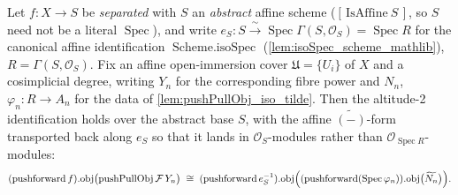 \begin{lemma}

  \label{lem:pushPullObj_iso_tilde_affine}
  Let \(f : X \to S\) be \emph{separated} with \(S\) an \emph{abstract} affine scheme
  (\([\,\mathrm{IsAffine}\ S\,]\), so \(S\) need not be a literal \(\operatorname{Spec}\)), and
  write \(e_S : S \xrightarrow{\ \sim\ } \operatorname{Spec}\Gamma(S, \mathcal{O}_S) =
  \operatorname{Spec} R\) for the canonical affine identification \(\operatorname{Scheme.isoSpec}\)
  (\cref{lem:isoSpec_scheme_mathlib}), \(R = \Gamma(S, \mathcal{O}_S)\). Fix an affine
  open-immersion cover \(\mathfrak{U} = \{U_i\}\) of \(X\) and a cosimplicial degree, writing
  \(Y_n\) for the corresponding fibre power and \(N_n\), \(\varphi_n : R \to A_n\) for the data of
  \cref{lem:pushPullObj_iso_tilde}. Then the altitude-2 identification holds over the abstract
  base \(S\), with the affine \(\widetilde{(-)}\)-form transported back along \(e_S\) so that it
  lands in \(\mathcal{O}_S\)-modules rather than \(\mathcal{O}_{\operatorname{Spec} R}\)-modules:
  \[
    (\operatorname{pushforward} f).\!\operatorname{obj}\bigl(\operatorname{pushPullObj}
      \mathcal{F}\, Y_n\bigr)
    \;\cong\;
    (\operatorname{pushforward} e_S^{-1}).\!\operatorname{obj}\Bigl(
      (\operatorname{pushforward}(\operatorname{Spec}\varphi_n)).\!\operatorname{obj}\bigl(
        \widetilde{N_n}\bigr)\Bigr).
  \]
\end{lemma}

